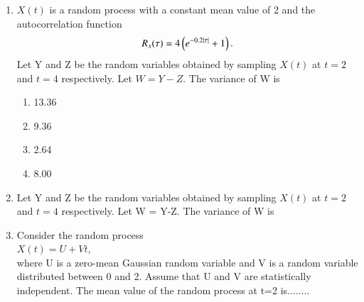 \renewcommand{\theequation}{\theenumi}
\renewcommand{\thefigure}{\theenumi}
\renewcommand{\thetable}{\theenumi}
\begin{enumerate}[label=\thesection.\arabic*.,ref=\thesection.\theenumi]

\item $X(t)$ is a random process with a constant mean value of 2 and the autocorrelation function 
\begin{align}
    R_x(\tau)=4\brak{e^{-0.2|\tau|}+1}.
    \label{process/1}
\end{align}
%
Let Y and Z be the random variables obtained by sampling $X(t)$ at $t=2$ and $t=4$ respectively. Let $W=Y-Z$. The variance of W is
\begin{enumerate}
    \item 13.36
    \item 9.36
    \item 2.64
    \item 8.00
\end{enumerate}
%
\solution

%
\item Let Y and Z be the random variables obtained by sampling $X(t)$ at $t=2$ and $t=4$ respectively. Let W = Y-Z. The variance of W is
\begin{enumerate}
\end{enumerate}

\item Consider the random process\\
$ X(t) = U+Vt$,\\
where U is a zero-mean Gaussian random variable and V is a random variable distributed between 0 and 2. Assume that U and V are statistically independent. The mean value of the random  process at t=2 is........
%
\solution



\end{enumerate}
